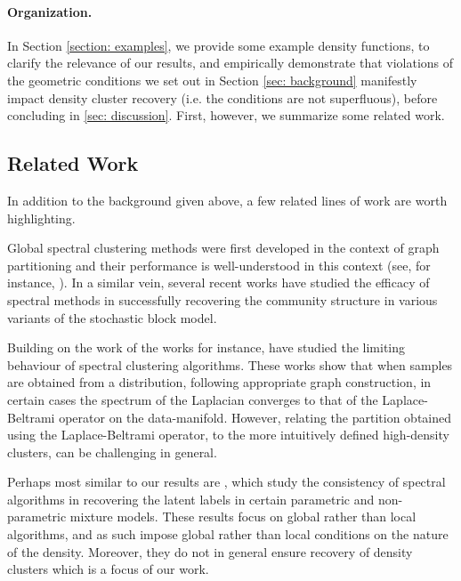 \documentclass{article}
\newcommand{\1}{\mathbf{1}}
\theoremstyle{aldenthm}
\theoremstyle{remark}
\begin{document}
\paragraph{Organization.}
In Section \ref{section: examples}, we provide some example density functions, to clarify the relevance of our results, and empirically demonstrate that violations of the geometric conditions we set out in Section \ref{sec: background} manifestly impact density cluster recovery (i.e. the conditions are not superfluous), before concluding in \ref{sec: discussion}. First, however, we summarize some related work.

\subsection{Related Work}
In addition to the background given above, a few related lines of work are worth highlighting.

Global spectral clustering 
methods were first developed in the context of graph partitioning \cite{fiedler1973,donath1973} 
and their performance is well-understood in this context (see, for instance, \cite{tolliver2006,luxburg2007}).
In a similar vein, several recent works \citep{mcsherry2001,lei2015,rohe2011,abbe2018,kamalika2012,balakrishnan2011} have studied the efficacy of spectral methods
in successfully recovering the community structure in various variants of the
stochastic block model.

Building on the work of \citet{koltchinskii2000} the works \citep{vonluxburg2008,hein2005} for instance, have studied the limiting behaviour of spectral clustering algorithms. These works show that when samples are obtained from a distribution, following 
appropriate graph construction, in certain cases the spectrum of the Laplacian 
converges to that of the Laplace-Beltrami operator on the data-manifold.
However, relating the partition obtained using the Laplace-Beltrami operator, to 
the 
more intuitively defined high-density clusters, can be challenging in general.


Perhaps most similar to our results are \citep{vempala2004,shi2009,schiebinger2015}, 
which study the consistency of spectral algorithms in recovering the latent labels in certain 
parametric and non-parametric mixture models. These results focus on global rather than local algorithms, and as such impose global rather than local conditions on the nature of the density. Moreover, they do not in general ensure recovery of density clusters which is a focus of our work.
\end{document}

